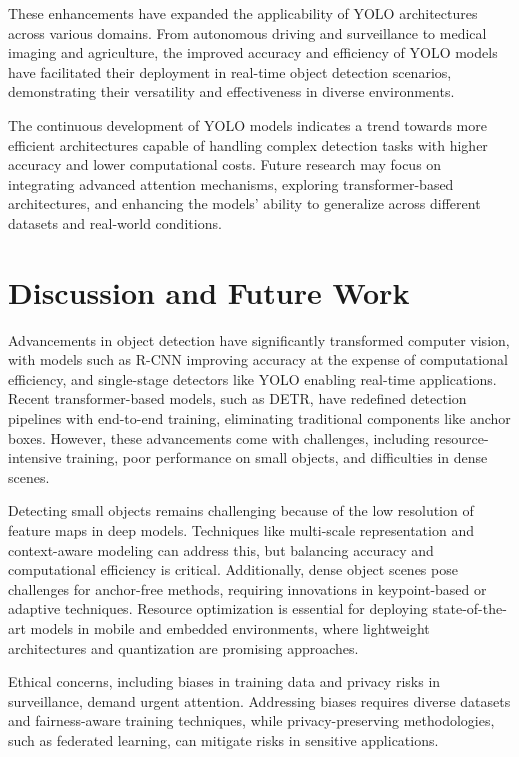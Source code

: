 \documentclass[3p,times]{elsarticle}
\begin{document}
These enhancements have expanded the applicability of YOLO architectures across various domains. From autonomous driving and surveillance to medical imaging and agriculture, the improved accuracy and efficiency of YOLO models have facilitated their deployment in real-time object detection scenarios, demonstrating their versatility and effectiveness in diverse environments.

The continuous development of YOLO models indicates a trend towards more efficient architectures capable of handling complex detection tasks with higher accuracy and lower computational costs. Future research may focus on integrating advanced attention mechanisms, exploring transformer-based architectures, and enhancing the models' ability to generalize across different datasets and real-world conditions.

\section{Discussion and Future Work} \label{discussions}

Advancements in object detection have significantly transformed computer vision, with models such as R-CNN improving accuracy at the expense of computational efficiency, and single-stage detectors like YOLO enabling real-time applications. Recent transformer-based models, such as DETR, have redefined detection pipelines with end-to-end training, eliminating traditional components like anchor boxes. However, these advancements come with challenges, including resource-intensive training, poor performance on small objects, and difficulties in dense scenes.

Detecting small objects remains challenging because of the low resolution of feature maps in deep models. Techniques like multi-scale representation and context-aware modeling can address this, but balancing accuracy and computational efficiency is critical. Additionally, dense object scenes pose challenges for anchor-free methods, requiring innovations in keypoint-based or adaptive techniques. Resource optimization is essential for deploying state-of-the-art models in mobile and embedded environments, where lightweight architectures and quantization are promising approaches.

Ethical concerns, including biases in training data and privacy risks in surveillance, demand urgent attention. Addressing biases requires diverse datasets and fairness-aware training techniques, while privacy-preserving methodologies, such as federated learning, can mitigate risks in sensitive applications.
\end{document}
